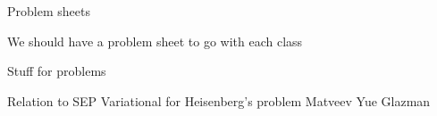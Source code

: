 
Problem sheets

We should have a problem sheet to go with each class

Stuff for problems

Relation to SEP
Variational for Heisenberg's problem
Matveev Yue Glazman
